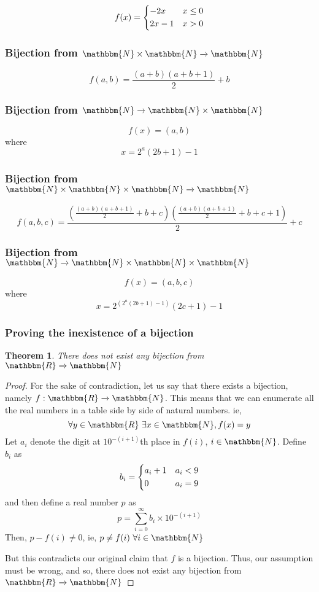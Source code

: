 \documentclass[14pt]{extarticle}
\newcommand{\impl}{\xrightarrow{}}
\newcommand{\N}{\mathbbm{N}}
\newcommand{\R}{\mathbbm{R}}
\newtheorem{theorem}{Theorem}
\begin{document}
\[
    f(x) = \begin{dcases}
        -2x & x \leq 0 \\
        2x-1 & x > 0
    \end{dcases}
\]

\subsubsection{Bijection from $\N \times \N \impl \N$}

\[
    f(a, b) = \frac{(a+b)(a+b+1)}{2} + b
\]

\subsubsection{Bijection from $\N \impl \N \times \N$}

\[
    f(x) = (a, b)
\]
where
\[
    x = 2^a (2b+1) - 1
\]

\subsubsection{Bijection from $\N \times \N \times \N \impl \N$}

\[
    f(a, b, c) =  \frac{\left(\frac{(a+b)(a+b+1)}{2} + b + c\right)\left(\frac{(a+b)(a+b+1)}{2} + b + c + 1\right)}{2} + c
\]

\subsubsection{Bijection from $\N \impl \N \times \N \times \N$}

\[
    f(x) = (a, b, c)
\]
where
\[
    x = 2^{(2^{a}(2b+1) - 1)}(2c+1) - 1
\]

\subsubsection{Proving the inexistence of a bijection}

\begin{theorem}
    There does not exist any bijection from $\R \impl \N$
\end{theorem}

\begin{proof}
    For the sake of contradiction, let us say that there exists a bijection, namely $f : \R \impl \N$. This means that we can enumerate all the real numbers in a table side by side of natural numbers. ie,
    \[
        \forall y \in \R \ \exists x \in \N, f(x) = y
    \]
    Let $a_i$ denote the digit at $10^{-(i+1)}$th place in $f(i)$, $i \in \N$. Define $b_i$ as
    \[
        b_i = \begin{dcases}
            a_i + 1 & a_i < 9 \\
            0 & a_i = 9
        \end{dcases}
    \]
    and then define a real number $p$ as
    \[
        p = \sum_{i = 0}^{\infty} b_i \times 10^{-(i+1)}
    \]
    Then, $p - f(i) \neq 0$, ie, $p \neq f(i) \ \forall i \in \N$

    But this contradicts our original claim that $f$ is a bijection. Thus, our assumption must be wrong, and so, there does not exist any bijection from $\R \impl \N$
\end{proof}
\end{document}
